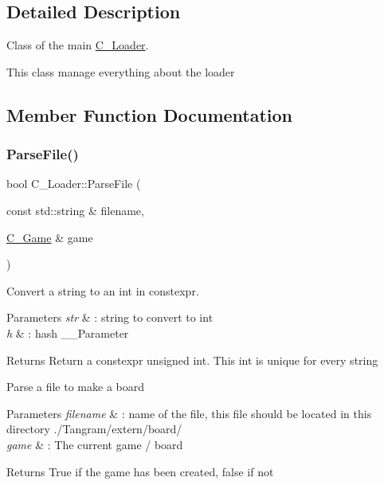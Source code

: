 \subsection{Detailed Description}
Class of the main \hyperlink{classC__Loader}{C\+\_\+\+Loader}. 

This class manage everything about the loader 

\subsection{Member Function Documentation}
\mbox{\label{classC__Loader_a7a6f0089933a6108eb92390afe0ead80}} 
\subsubsection{\texorpdfstring{Parse\+File()}{ParseFile()}\hspace{0.1cm}{\footnotesize\ttfamily [1/2]}}
{\footnotesize\ttfamily bool C\+\_\+\+Loader\+::\+Parse\+File (\begin{DoxyParamCaption}\item[{const std\+::string \&}]{filename,  }\item[{\hyperlink{classC__Game}{C\+\_\+\+Game} \&}]{game }\end{DoxyParamCaption})\hspace{0.3cm}{\ttfamily [static]}}



Convert a string to an int in constexpr. 


\begin{DoxyParams}{Parameters}
{\em str} & \+: string to convert to int \\
\hline
{\em h} & \+: hash \+\_\+\+\_\+\+Parameter \\
\hline
\end{DoxyParams}
\begin{DoxyReturn}{Returns}
Return a constexpr unsigned int. This int is unique for every string
\end{DoxyReturn}
Parse a file to make a board 
\begin{DoxyParams}{Parameters}
{\em filename} & \+: name of the file, this file should be located in this directory ./\+Tangram/extern/board/ \\
\hline
{\em game} & \+: The current game / board \\
\hline
\end{DoxyParams}
\begin{DoxyReturn}{Returns}
True if the game has been created, false if not 
\end{DoxyReturn}
\mbox{\label{classC__Loader_aaa555ff55462405a34610adc1055371e}} 
